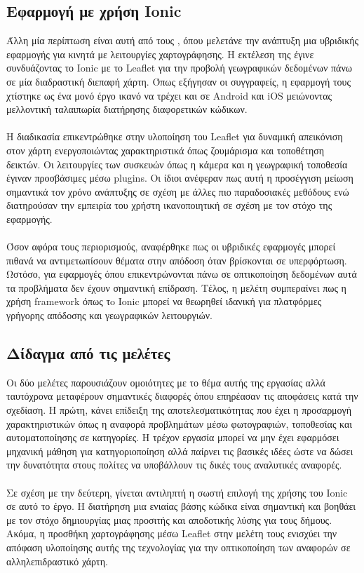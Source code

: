 \subsection{Εφαρμογή με χρήση Ionic}
Άλλη μία περίπτωση είναι αυτή από τους \textcite{dunka2017}, όπου μελετάνε την ανάπτυξη μια υβριδικής εφαρμογής για κινητά με λειτουργίες χαρτογράφησης. Η εκτέλεση της έγινε συνδυάζοντας το Ionic με το Leaflet για την προβολή γεωγραφικών δεδομένων πάνω σε μία διαδραστική διεπαφή χάρτη. Όπως εξήγησαν οι συγγραφείς, η εφαρμογή τους χτίστηκε ως ένα μονό έργο ικανό να τρέχει και σε Android και iOS μειώνοντας μελλοντική ταλαιπωρία διατήρησης διαφορετικών κώδικων. 
\\
\\
Η διαδικασία επικεντρώθηκε στην υλοποίηση του Leaflet για δυναμική απεικόνιση στον χάρτη ενεργοποιώντας χαρακτηριστικά όπως ζουμάρισμα και τοποθέτηση δεικτών. Οι λειτουργίες των συσκευών όπως η κάμερα και η γεωγραφική τοποθεσία έγιναν προσβάσιμες μέσω plugins. Οι ίδιοι ανέφεραν πως αυτή η προσέγγιση μείωση σημαντικά τον χρόνο ανάπτυξης σε σχέση με άλλες πιο παραδοσιακές μεθόδους ενώ διατηρούσαν την εμπειρία του χρήστη ικανοποιητική σε σχέση με τον στόχο της εφαρμογής.
\\
\\
Όσον αφόρα τους περιορισμούς, αναφέρθηκε πως οι υβριδικές εφαρμογές μπορεί πιθανά να αντιμετωπίσουν θέματα στην απόδοση όταν βρίσκονται σε υπερφόρτωση. Ωστόσο, για εφαρμογές όπου επικεντρώνονται πάνω σε οπτικοποίηση δεδομένων αυτά τα προβλήματα δεν έχουν σημαντική επίδραση. Τέλος, η μελέτη συμπεραίνει πως η χρήση framework όπως τo Ionic μπορεί να θεωρηθεί ιδανική για πλατφόρμες γρήγορης απόδοσης και γεωγραφικών λειτουργιών.

\subsection{Δίδαγμα από τις μελέτες}
Οι δύο μελέτες παρουσιάζουν ομοιότητες με το θέμα αυτής της εργασίας αλλά ταυτόχρονα μεταφέρουν σημαντικές διαφορές όπου επηρέασαν τις αποφάσεις κατά την σχεδίαση. Η πρώτη, κάνει επίδειξη της αποτελεσματικότητας που έχει η προσαρμογή χαρακτηριστικών όπως η αναφορά προβλημάτων μέσω φωτογραφιών, τοποθεσίας και αυτοματοποίησης σε κατηγορίες. Η τρέχον εργασία μπορεί να μην έχει εφαρμόσει μηχανική μάθηση για κατηγοριοποίηση αλλά παίρνει τις βασικές ιδέες ώστε να δώσει την δυνατότητα στους πολίτες να υποβάλλουν τις δικές τους αναλυτικές αναφορές. 
\\
\\
Σε σχέση με την δεύτερη, γίνεται αντιληπτή η σωστή επιλογή της χρήσης του Ionic σε αυτό το έργο. Η διατήρηση μια ενιαίας βάσης κώδικα είναι σημαντική και βοηθάει με τον στόχο δημιουργίας μιας προσιτής και αποδοτικής λύσης για τους δήμους. Ακόμα, η προσθήκη χαρτογράφησης μέσω Leaflet στην μελέτη τους ενισχύει την απόφαση υλοποίησης αυτής της τεχνολογίας για την οπτικοποίηση των αναφορών σε αλληλεπιδραστικό χάρτη.